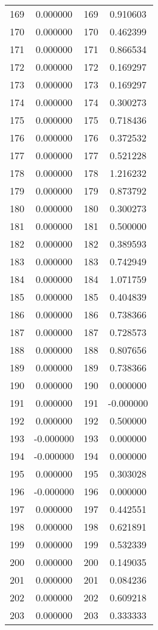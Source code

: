 \documentclass[12pt]{article}
\begin{document}
\begin{longtable}{@{}cccc@{}}
169 & 0.000000 & 169 & 0.910603 \\
170 & 0.000000 & 170 & 0.462399 \\
171 & 0.000000 & 171 & 0.866534 \\
172 & 0.000000 & 172 & 0.169297 \\
173 & 0.000000 & 173 & 0.169297 \\
174 & 0.000000 & 174 & 0.300273 \\
175 & 0.000000 & 175 & 0.718436 \\
176 & 0.000000 & 176 & 0.372532 \\
177 & 0.000000 & 177 & 0.521228 \\
178 & 0.000000 & 178 & 1.216232 \\
179 & 0.000000 & 179 & 0.873792 \\
180 & 0.000000 & 180 & 0.300273 \\
181 & 0.000000 & 181 & 0.500000 \\
182 & 0.000000 & 182 & 0.389593 \\
183 & 0.000000 & 183 & 0.742949 \\
184 & 0.000000 & 184 & 1.071759 \\
185 & 0.000000 & 185 & 0.404839 \\
186 & 0.000000 & 186 & 0.738366 \\
187 & 0.000000 & 187 & 0.728573 \\
188 & 0.000000 & 188 & 0.807656 \\
189 & 0.000000 & 189 & 0.738366 \\
190 & 0.000000 & 190 & 0.000000 \\
191 & 0.000000 & 191 & -0.000000 \\
192 & 0.000000 & 192 & 0.500000 \\
193 & -0.000000 & 193 & 0.000000 \\
194 & -0.000000 & 194 & 0.000000 \\
195 & 0.000000 & 195 & 0.303028 \\
196 & -0.000000 & 196 & 0.000000 \\
197 & 0.000000 & 197 & 0.442551 \\
198 & 0.000000 & 198 & 0.621891 \\
199 & 0.000000 & 199 & 0.532339 \\
200 & 0.000000 & 200 & 0.149035 \\
201 & 0.000000 & 201 & 0.084236 \\
202 & 0.000000 & 202 & 0.609218 \\
203 & 0.000000 & 203 & 0.333333 \\

\end{longtable}
\end{document}

